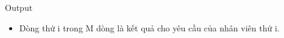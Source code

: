Output
\begin{itemize}
	\item 

Dòng thứ i trong M dòng là kết quả cho yêu cầu của nhân viên thứ i.
\end{itemize}